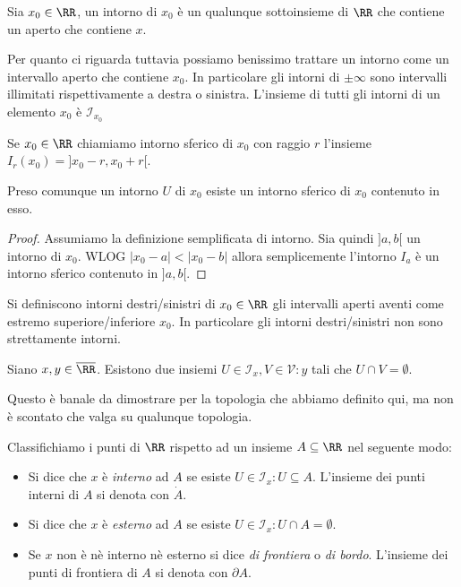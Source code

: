 \documentclass[11pt]{scrartcl}
\begin{document}
	\begin{definition}[Intorno]
		Sia $x_0\in\RR$, un intorno di $x_0$ è un qualunque sottoinsieme di $\RR$ che contiene un aperto che contiene $x$.
	\end{definition}
	Per quanto ci riguarda tuttavia possiamo benissimo trattare un intorno come un intervallo aperto che contiene $x_0$. In particolare gli intorni di $\pm\infty$ 
	sono intervalli illimitati rispettivamente a destra o sinistra. L'insieme di tutti gli intorni di un elemento $x_0$ è $\mathcal{I}_{x_0}$
	\begin{definition}
		Se $x_0\in \RR$ chiamiamo intorno sferico di $x_0$ con raggio $r$ l'insieme $I_r(x_0)=]x_0-r,x_0+r[$.
	\end{definition}
	\begin{proposition}
		Preso comunque un intorno $U$ di $x_0$ esiste un intorno sferico di $x_0$ contenuto in esso.
	\end{proposition}
	\begin{proof}
		Assumiamo la definizione semplificata di intorno. Sia quindi $]a,b[$ un intorno di $x_0$. WLOG $|x_0-a|<|x_0-b|$ allora semplicemente l'intorno $I_a$ è un intorno sferico contenuto in $]a,b[$.
	\end{proof}
	\begin{definition}
		Si definiscono intorni destri/sinistri di $x_0\in\RR$ gli intervalli aperti aventi come estremo superiore/inferiore $x_0$. In particolare gli intorni destri/sinistri non sono strettamente intorni.
	\end{definition}
	\begin{proposition}
		Siano $x,y\in\overline{\RR}$. Esistono due insiemi $U\in\mathcal{I}_x,V\in\mathcal{V}:y$ tali che $U\cap V = \emptyset$.
	\end{proposition}
	Questo è banale da dimostrare per la topologia che abbiamo definito qui, ma non è scontato che valga su qualunque topologia.
	
	\begin{definition}
		Classifichiamo i punti di $\RR$ rispetto ad un insieme $A\subseteq\RR$ nel seguente modo:
		\begin{itemize}
			\item Si dice che $x$ è \textit{interno} ad $A$ se esiste $U\in \mathcal{I}_x:U\subseteq A$. L'insieme dei punti interni di $A$ si denota con $\dot{A}$.
			\item Si dice che $x$ è \textit{esterno} ad $A$ se esiste $U\in \mathcal{I}_x:U\cap A=\emptyset$.
			\item Se $x$ non è nè interno nè esterno si dice \textit{di frontiera} o \textit{di bordo}. L'insieme dei punti di frontiera di $A$ si denota con $\partial A$.
		\end{itemize}
	\end{definition}
	
\end{document}
